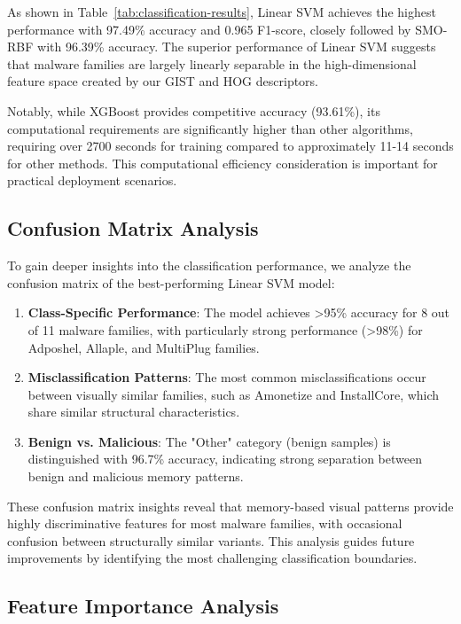 As shown in Table~\ref{tab:classification-results}, Linear SVM achieves the highest performance with 97.49\% accuracy and 0.965 F1-score, closely followed by SMO-RBF with 96.39\% accuracy. The superior performance of Linear SVM suggests that malware families are largely linearly separable in the high-dimensional feature space created by our GIST and HOG descriptors.

Notably, while XGBoost provides competitive accuracy (93.61\%), its computational requirements are significantly higher than other algorithms, requiring over 2700 seconds for training compared to approximately 11-14 seconds for other methods. This computational efficiency consideration is important for practical deployment scenarios.

\subsection{Confusion Matrix Analysis}
\label{subsec:confusion-matrix}

To gain deeper insights into the classification performance, we analyze the confusion matrix of the best-performing Linear SVM model:

\begin{enumerate}
    \item \textbf{Class-Specific Performance}: The model achieves >95\% accuracy for 8 out of 11 malware families, with particularly strong performance (>98\%) for Adposhel, Allaple, and MultiPlug families.
    
    \item \textbf{Misclassification Patterns}: The most common misclassifications occur between visually similar families, such as Amonetize and InstallCore, which share similar structural characteristics.
    
    \item \textbf{Benign vs. Malicious}: The "Other" category (benign samples) is distinguished with 96.7\% accuracy, indicating strong separation between benign and malicious memory patterns.
\end{enumerate}

These confusion matrix insights reveal that memory-based visual patterns provide highly discriminative features for most malware families, with occasional confusion between structurally similar variants. This analysis guides future improvements by identifying the most challenging classification boundaries.

\subsection{Feature Importance Analysis}
\label{subsec:feature-importance}

